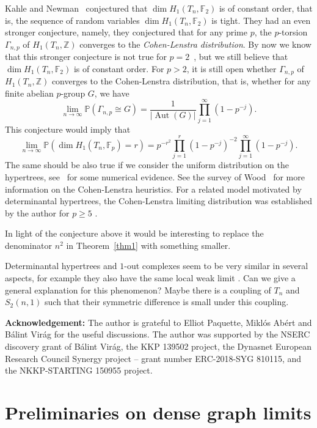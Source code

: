 \documentclass[11pt,a4paper]{article}
\theoremstyle{plain}
\theoremstyle{definition}
\DeclareMathOperator{\Aut}{Aut}
\begin{document}
Kahle and Newman~\cite{kahle2022topology} conjectured that $\dim H_1(T_n,\mathbb{F}_2)$ is of constant order, that is, the sequence of random variables $\dim H_1(T_n,\mathbb{F}_2)$ is tight. They had an even stronger conjecture, namely, they conjectured that for any prime $p$, the $p$-torsion $\Gamma_{n,p}$ of $H_1(T_n,\mathbb{Z})$  converges to the \emph{Cohen-Lenstra distribution}. By now we know that this stronger conjecture is not true for $p=2$~\cite{meszaros20242}, but we still believe that $\dim H_1(T_n,\mathbb{F}_2)$ is of constant order. For $p>2$, it is still open whether $\Gamma_{n,p}$ of $H_1(T_n,\mathbb{Z})$  converges to the Cohen-Lenstra distribution, that is, whether  for any finite abelian $p$-group $G$, we have
\[\lim_{n\to\infty} \mathbb{P}(\Gamma_{n,p}\cong G)=\frac{1}{|\Aut(G)|}\prod_{j=1}^{\infty}\left(1-p^{-j}\right).\]
This conjecture would imply that
\[\lim_{n\to\infty} \mathbb{P}(\dim  H_1(T_n,\mathbb{F}_p)=r)=p^{-r^2} \prod_{j=1}^{r} \left(1-p^{-j}\right)^{-2} \prod_{j=1}^{\infty}\left(1-p^{-j}\right).\]
The same should be also true if we consider the uniform distribution on the hypertrees, see~\cite{kahle2020cohen} for some numerical evidence. 
See the survey of Wood~\cite{wood2022probability} for more information on the Cohen-Lenstra heuristics. For a related model motivated by determinantal hypertrees, the Cohen-Lenstra limiting distribution was established by the author for $p\ge 5$ \cite{meszaros2023cohen}.

In light of the conjecture above it would be interesting to replace the denominator $n^2$ in Theorem~\ref{thm1} with something smaller.

Determinantal hypertrees and $1$-out complexes seem to be very similar in several aspects, for example they also have the same local weak limit \cite{meszaros2022local}. Can we give a general explanation for this phenomenon? Maybe there is a coupling of $T_n$ and $S_2(n,1)$ such that their symmetric difference is small under this coupling. 

\bigskip

\textbf{Acknowledgement:} The author is grateful to Elliot Paquette, Mikl\'os Ab\'ert and B\'alint Vir\'ag for the useful discussions.
The author was supported by the NSERC discovery grant of B\'alint Vir\'ag, the KKP 139502 project, the Dynasnet European Research Council Synergy project -- grant number ERC-2018-SYG 810115, and the NKKP-STARTING 150955 project.


\section{Preliminaries on dense graph limits}
\end{document}
